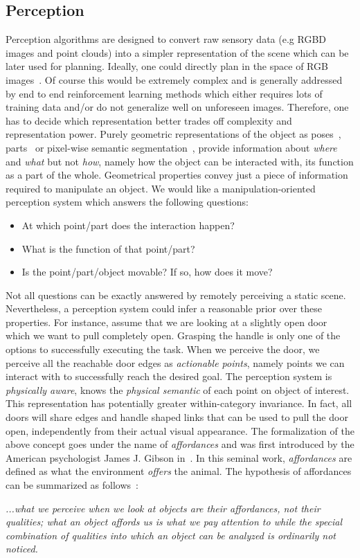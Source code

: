 \subsection{Perception}
Perception algorithms are designed to convert raw sensory data (e.g RGBD images and point clouds) into a simpler representation of the scene which can be later used for planning. Ideally, one could directly plan in the space of RGB images~\cite{levine2016end}. Of course this would be extremely complex and is generally addressed by end to end reinforcement learning methods which either requires lots of training data and/or do not generalize well on unforeseen images. Therefore, one has to decide which representation better trades off complexity and representation power. Purely geometric representations of the object as poses~\cite{xiang2017posecnn}, parts~\cite{li2020category} or pixel-wise semantic segmentation~\cite{jang2017end}, provide information about \emph{where} and \emph{what} but not \emph{how}, namely how the object can be interacted with, its function as a part of the whole. Geometrical properties convey just a piece of information required to manipulate an object. We would like a manipulation-oriented perception system which answers the following questions:
\begin{itemize}
\item At which point/part does the interaction happen?
\item What is the function of that point/part?
\item Is the point/part/object movable? If so, how does it move?
\end{itemize}     

Not all questions can be exactly answered by remotely perceiving a static scene. Nevertheless, a perception system could infer a reasonable prior over these properties. For instance, assume that we are looking at a slightly open door which we want to pull completely open. Grasping the handle is only one of the options to successfully executing the task. When we perceive the door, we perceive all the reachable door edges as \emph{actionable points}, namely points we can interact with to successfully reach the desired goal. The perception system is \emph{physically aware}, knows the \emph{physical semantic} of each point on object of interest. This representation has potentially greater within-category invariance. In fact, all doors will share edges and handle shaped links that can be used to pull the door open, independently from their actual visual appearance. The formalization of the above concept goes under the name of \emph{affordances} and was first introduced by the American psychologist James J. Gibson in~\cite{gibson1977theory}. In this seminal work, \emph{affordances} are defined as what the environment \emph{offers} the animal. The hypothesis of affordances can be summarized as follows~\cite{gibson1977theory}:
\begin{displayquote}
\emph{...what we perceive when we look at objects are their affordances, not their qualities; what an object affords us is what we pay attention to while the special combination of qualities into which an object can be analyzed is ordinarily not noticed.} 
\end{displayquote}

